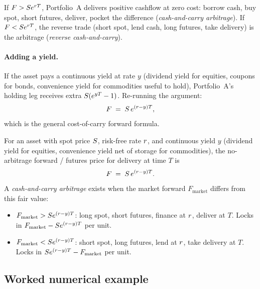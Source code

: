 If $F > S e^{r T}$, Portfolio~A delivers positive cashflow
at zero cost: borrow cash, buy spot, short futures, deliver,
pocket the difference (\emph{cash-and-carry arbitrage}). If
$F < S e^{r T}$, the reverse trade (short spot, lend
cash, long futures, take delivery) is the arbitrage
(\emph{reverse cash-and-carry}).

\paragraph{Adding a yield.} If the asset pays a continuous yield
at rate $y$ (dividend yield for equities, coupons for bonds,
convenience yield for commodities useful to hold), Portfolio~A's
holding leg receives extra $S(e^{yT}-1)$. Re-running the
argument:
\begin{equation}
  F \;=\; S \, e^{(r - y) T},
  \label{eq:cost_of_carry}
\end{equation}
which is the general cost-of-carry forward formula.

\begin{keyfactbox}
\label{kf:cost_of_carry}
For an asset with spot price $S$, risk-free rate $r$, and
continuous yield $y$ (dividend yield for equities, convenience
yield net of storage for commodities), the no-arbitrage
forward / futures price for delivery at time $T$ is
\begin{equation}
  F \;=\; S \, e^{(r - y) T}.
\end{equation}
A \emph{cash-and-carry arbitrage} exists when the market
forward $F_{\text{market}}$ differs from this fair value:
\begin{itemize}
  \item $F_{\text{market}} > S e^{(r-y)T}$: long spot,
  short futures, finance at $r$, deliver at $T$. Locks in
  $F_{\text{market}} - S e^{(r-y)T}$ per unit.
  \item $F_{\text{market}} < S e^{(r-y)T}$: short spot,
  long futures, lend at $r$, take delivery at $T$. Locks in
  $S e^{(r-y)T} - F_{\text{market}}$ per unit.
\end{itemize}
\end{keyfactbox}

\subsection{Worked numerical example}
\label{sec:ch13_carry_example}

